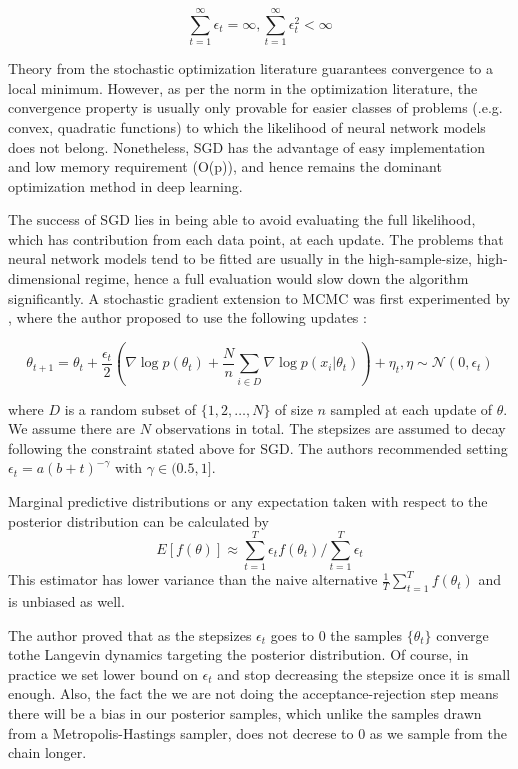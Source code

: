 \documentclass[]{report}
\begin{document}
\[ \sum_{t=1}^\infty \epsilon_t = \infty , \sum_{t=1}^\infty \epsilon_t^2 < \infty \]

Theory from the stochastic optimization literature \cite{robbins1951stochastic} guarantees convergence to a local minimum. However, as per the norm in the optimization literature, the convergence property is usually only provable for easier classes of problems (.e.g. convex, quadratic functions) to which the likelihood of neural network models does not belong. Nonetheless, SGD has the advantage of easy implementation and low memory requirement (O(p)), and hence remains the dominant optimization method in deep learning.  

The success of SGD lies in being able to avoid evaluating the full likelihood, which has contribution from each data point, at each update. The problems that neural network models tend to be fitted are usually in the high-sample-size, high-dimensional regime, hence a full evaluation would slow down the algorithm significantly. A stochastic gradient extension to MCMC was first experimented by \cite{welling2011bayesian}, where the author proposed to use the following updates :

\[\theta_{t+1} = \theta_t + \frac{\epsilon_t}{2} ( \nabla \log p(\theta_t) + \frac{N}{n} \sum_{i \in D} \nabla \log p(x_i|\theta_t) ) + \eta_t , \eta \sim \mathcal{N}(0,\epsilon_t) \]

where $D$ is a random subset of $\{1,2, \dots, N\}$ of size $n$ sampled at each update of $\theta$. We assume there are $N$ observations in total. The stepsizes are assumed to decay following the constraint stated above for SGD. The authors recommended setting $\epsilon_t = a(b+t)^{-\gamma} $ with $\gamma \in (0.5,1]$.  

Marginal predictive distributions or any expectation taken with respect to the posterior distribution can be calculated by 
\[ E[f(\theta)] \approx \sum_{t=1}^T \epsilon_t f(\theta_t) / \sum_{t=1}^T \epsilon_t \] 
This estimator has lower variance than the naive alternative $\frac{1}{T} \sum_{t=1}^T f(\theta_t) $ and is unbiased as well. 

The author proved that as the stepsizes $\epsilon_t$ goes to $0$ the samples $\{\theta_t\}$ converge tothe Langevin dynamics targeting the posterior distribution. Of course, in practice we set lower bound on $\epsilon_t$ and stop decreasing the stepsize once it is small enough. Also, the fact the we are not doing the acceptance-rejection step means there will be a bias in our posterior samples, which unlike the samples drawn from a Metropolis-Hastings sampler, does not decrese to $0$ as we sample from the chain longer.
\end{document}
